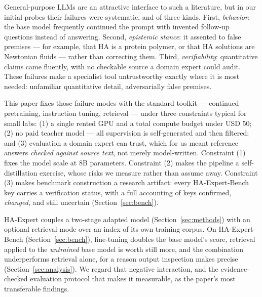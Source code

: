 \documentclass[11pt]{article}
\begin{document}
General-purpose LLMs are an attractive interface to such a literature,
but in our initial probes their failures were systematic, and of three
kinds. First, \emph{behavior}: the base model frequently
continued the prompt with invented follow-up questions instead of
answering. Second, \emph{epistemic stance}: it assented to false premises
--- for example, that HA is a protein polymer, or that HA solutions are
Newtonian fluids --- rather than correcting them. Third,
\emph{verifiability}: quantitative claims came fluently, with no
checkable source a domain expert could audit. These failures make a
specialist tool untrustworthy exactly where it is most
needed: unfamiliar quantitative detail, adversarially false premises.

This paper fixes those failure modes with the standard
toolkit --- continued pretraining, instruction tuning, retrieval --- under
three constraints typical for small labs:
(1) a single rented GPU and a total compute budget under USD 50; (2) no
paid teacher model --- all supervision is self-generated and then
filtered; and (3) evaluation a domain expert can trust, which for us meant
reference answers \emph{checked against source text}, not merely
model-written. Constraint (1) fixes
the model scale at 8B parameters. Constraint (2) makes the pipeline a self-distillation exercise,
whose risks we measure rather than assume away. Constraint (3) makes
benchmark construction a research artifact: every
HA-Expert-Bench key carries a verification status, with a full accounting
of keys confirmed, \emph{changed}, and still uncertain
(Section~\ref{sec:bench}).

HA-Expert couples a two-stage adapted model
(Section~\ref{sec:methods}) with an optional retrieval mode over an index
of its own training corpus. On HA-Expert-Bench
(Section~\ref{sec:bench}), fine-tuning doubles the base model's score,
retrieval applied to the \emph{untrained} base model is worth still more,
and the combination underperforms retrieval alone, for a reason output
inspection makes precise (Section~\ref{sec:analysis}). We regard that
negative interaction, and the evidence-checked evaluation protocol that
makes it measurable, as the paper's most transferable findings.
\end{document}
